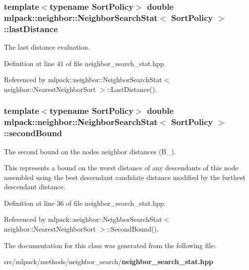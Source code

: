 \subsubsection[{last\+Distance}]{\setlength{\rightskip}{0pt plus 5cm}template$<$typename Sort\+Policy$>$ double {\bf mlpack\+::neighbor\+::\+Neighbor\+Search\+Stat}$<$ Sort\+Policy $>$\+::last\+Distance\hspace{0.3cm}{\ttfamily [private]}}\label{classmlpack_1_1neighbor_1_1NeighborSearchStat_ac009992f1081ef962a16023f8e00c691}


The last distance evaluation. 



Definition at line 41 of file neighbor\+\_\+search\+\_\+stat.\+hpp.



Referenced by mlpack\+::neighbor\+::\+Neighbor\+Search\+Stat$<$ neighbor\+::\+Nearest\+Neighbor\+Sort $>$\+::\+Last\+Distance().

\subsubsection[{second\+Bound}]{\setlength{\rightskip}{0pt plus 5cm}template$<$typename Sort\+Policy$>$ double {\bf mlpack\+::neighbor\+::\+Neighbor\+Search\+Stat}$<$ Sort\+Policy $>$\+::second\+Bound\hspace{0.3cm}{\ttfamily [private]}}\label{classmlpack_1_1neighbor_1_1NeighborSearchStat_a42c403ceeff0a2bbc4c386924c8dcf05}


The second bound on the node\textquotesingle{}s neighbor distances (B\+\_). 

This represents a bound on the worst distance of any descendants of this node assembled using the best descendant candidate distance modified by the furthest descendant distance. 

Definition at line 36 of file neighbor\+\_\+search\+\_\+stat.\+hpp.



Referenced by mlpack\+::neighbor\+::\+Neighbor\+Search\+Stat$<$ neighbor\+::\+Nearest\+Neighbor\+Sort $>$\+::\+Second\+Bound().



The documentation for this class was generated from the following file\+:\begin{DoxyCompactItemize}
\item 
src/mlpack/methods/neighbor\+\_\+search/{\bf neighbor\+\_\+search\+\_\+stat.\+hpp}\end{DoxyCompactItemize}
